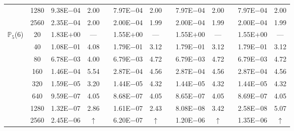\begin{table}[H]
{\begin{tabular}{@{}l c c c c c c c c c c c c@{}}
 & 1280 & 9.38E$-$04 & 2.00 &  & 7.97E$-$04 & 2.00 &  & 7.97E$-$04 & 2.00 &  & 7.97E$-$04 & 2.00\\
 & 2560 & 2.35E$-$04 & 2.00 &  & 2.00E$-$04 & 1.99 &  & 2.00E$-$04 & 1.99 &  & 2.00E$-$04 & 1.99\\
\midrule
\multirow{8}{*}{$\mathbb{P}_{5}$(6)}
 & 20 & 1.83E$+$00 & --- &  & 1.55E$+$00 & --- &  & 1.55E$+$00 & --- &  & 1.55E$+$00 & ---\\
 & 40 & 1.08E$-$01 & 4.08 &  & 1.79E$-$01 & 3.12 &  & 1.79E$-$01 & 3.12 &  & 1.79E$-$01 & 3.12\\
 & 80 & 6.78E$-$03 & 4.00 &  & 6.79E$-$03 & 4.72 &  & 6.79E$-$03 & 4.72 &  & 6.79E$-$03 & 4.72\\
 & 160 & 1.46E$-$04 & 5.54 &  & 2.87E$-$04 & 4.56 &  & 2.87E$-$04 & 4.56 &  & 2.87E$-$04 & 4.56\\
 & 320 & 1.59E$-$05 & 3.20 &  & 1.44E$-$05 & 4.32 &  & 1.44E$-$05 & 4.32 &  & 1.44E$-$05 & 4.32\\
 & 640 & 9.59E$-$07 & 4.05 &  & 8.68E$-$07 & 4.05 &  & 8.65E$-$07 & 4.05 &  & 8.69E$-$07 & 4.05\\
 & 1280 & 1.32E$-$07 & 2.86 &  & 1.61E$-$07 & 2.43 &  & 8.08E$-$08 & 3.42 &  & 2.58E$-$08 & 5.07\\
 & 2560 & 2.45E$-$06 & $\uparrow$ &  & 6.20E$-$07 & $\uparrow$ &  & 1.20E$-$06 & $\uparrow$ &  & 1.35E$-$06 & $\uparrow$\\
\bottomrule
\end{tabular}}
\label{PRO:bending:01_01_glob6_pro5}
\end{table}
